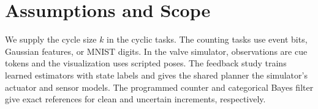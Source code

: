 \section{Assumptions and Scope}
\label{sec:scope}
We supply the cycle size $k$ in the cyclic tasks. The counting tasks use event
bits, Gaussian features, or MNIST digits. In the valve simulator, observations
are cue tokens and the visualization uses scripted poses. The feedback study
trains learned estimators with state labels and gives the shared planner the
simulator's actuator and sensor models. The programmed counter and categorical
Bayes filter give exact references for clean and uncertain increments,
respectively.
